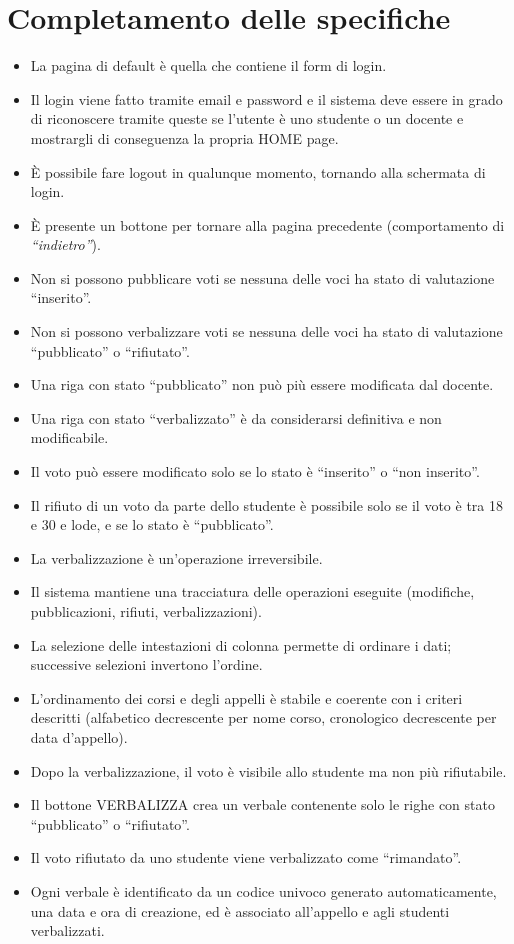\documentclass[a4paper,12pt]{scrreprt}
\begin{document}
\vspace{3em}

\section{Completamento delle specifiche}
\begin{itemize}
     \item La pagina di default è quella che contiene il form di login.
    \item Il login viene fatto tramite email e password e il sistema deve essere in grado di riconoscere tramite queste se l'utente è uno studente o un docente e mostrargli di conseguenza la propria HOME page.
    \item È possibile fare logout in qualunque momento, tornando alla schermata di login.
    \item È presente un bottone per tornare alla pagina precedente (comportamento di \textit{“indietro”}).
    \item Non si possono pubblicare voti se nessuna delle voci ha stato di valutazione ``inserito''.
    \item Non si possono verbalizzare voti se nessuna delle voci ha stato di valutazione ``pubblicato'' o ``rifiutato''.
    \item Una riga con stato ``pubblicato'' non può più essere modificata dal docente.
    \item Una riga con stato ``verbalizzato'' è da considerarsi definitiva e non modificabile.
    \item Il voto può essere modificato solo se lo stato è ``inserito'' o ``non inserito''.
    \item Il rifiuto di un voto da parte dello studente è possibile solo se il voto è tra 18 e 30 e lode, e se lo stato è ``pubblicato''.
    \item La verbalizzazione è un’operazione irreversibile.
    \item Il sistema mantiene una tracciatura delle operazioni eseguite (modifiche, pubblicazioni, rifiuti, verbalizzazioni).
    \item La selezione delle intestazioni di colonna permette di ordinare i dati; successive selezioni invertono l’ordine.
    \item L’ordinamento dei corsi e degli appelli è stabile e coerente con i criteri descritti (alfabetico decrescente per nome corso, cronologico decrescente per data d’appello).
    \item Dopo la verbalizzazione, il voto è visibile allo studente ma non più rifiutabile.
    \item Il bottone VERBALIZZA crea un verbale contenente solo le righe con stato ``pubblicato'' o ``rifiutato''.
    \item Il voto rifiutato da uno studente viene verbalizzato come ``rimandato''.
    \item Ogni verbale è identificato da un codice univoco generato automaticamente, una data e ora di creazione, ed è associato all’appello e agli studenti verbalizzati.
\end{itemize}
\end{document}
